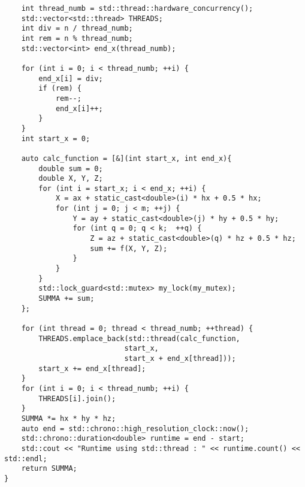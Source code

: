 \documentclass{report}
\begin{document}
\begin{lstlisting}
    int thread_numb = std::thread::hardware_concurrency();
    std::vector<std::thread> THREADS;
    int div = n / thread_numb;
    int rem = n % thread_numb;
    std::vector<int> end_x(thread_numb);

    for (int i = 0; i < thread_numb; ++i) {
        end_x[i] = div;
        if (rem) {
            rem--;
            end_x[i]++;
        }
    }
    int start_x = 0;

    auto calc_function = [&](int start_x, int end_x){
        double sum = 0;
        double X, Y, Z;
        for (int i = start_x; i < end_x; ++i) {
            X = ax + static_cast<double>(i) * hx + 0.5 * hx;
            for (int j = 0; j < m; ++j) {
                Y = ay + static_cast<double>(j) * hy + 0.5 * hy;
                for (int q = 0; q < k;  ++q) {
                    Z = az + static_cast<double>(q) * hz + 0.5 * hz;
                    sum += f(X, Y, Z);
                }
            }
        }
        std::lock_guard<std::mutex> my_lock(my_mutex);
        SUMMA += sum;
    };

    for (int thread = 0; thread < thread_numb; ++thread) {
        THREADS.emplace_back(std::thread(calc_function,
                            start_x,
                            start_x + end_x[thread]));
        start_x += end_x[thread];
    }
    for (int i = 0; i < thread_numb; ++i) {
        THREADS[i].join();
    }
    SUMMA *= hx * hy * hz;
    auto end = std::chrono::high_resolution_clock::now();
    std::chrono::duration<double> runtime = end - start;
    std::cout << "Runtime using std::thread : " << runtime.count() << std::endl;
    return SUMMA;
}

\end{lstlisting}
\end{document}
